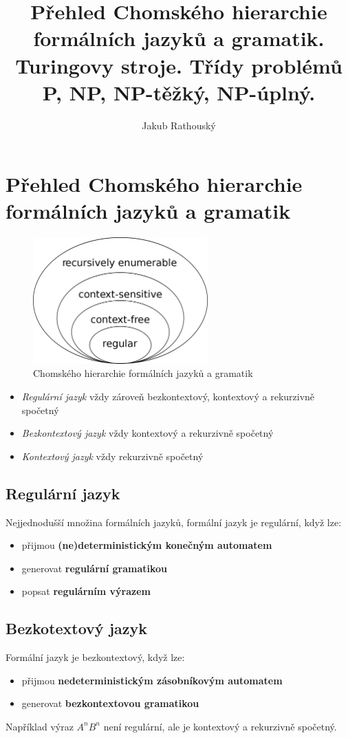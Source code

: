 \documentclass{szzclass}
\title{Přehled Chomského hierarchie formálních jazyků a gramatik. Turingovy stroje. Třídy problémů P, NP, NP-těžký, NP-úplný.}
\author{Jakub Rathouský}
\begin{document}
\maketitle
\tableofcontents
\newpage

\section{Přehled Chomského hierarchie formálních ja\-zyků a gramatik}

\begin{figure}[ht]
    \centering
    \includegraphics[width=0.6\textwidth]{topics/bi-spol-01/images/Chomsky_hierarchy.png}
    \caption{Chomského hierarchie formálních jazyků a gramatik}
\end{figure}

\begin{itemize}
\item\textit{Regulární jazyk}
vždy zároveň bezkontextový, kontextový a rekurzivně spočetný
\item\textit{Bezkontextový jazyk}
vždy kontextový a rekurzivně spočetný
\item\textit{Kontextový jazyk}
vždy rekurzivně spočetný
\end{itemize}

\subsection{Regulární jazyk}
Nejjednodušší množina formálních jazyků, formální jazyk je regulární, když lze:
\begin{itemize}
\item přijmou \textbf{(ne)deterministickým konečným automatem}
\item generovat \textbf{regulární gramatikou}
\item popsat \textbf{regulárním výrazem}
\end{itemize}

\subsection{Bezkotextový jazyk}
Formální jazyk je bezkontextový, když lze:
\begin{itemize}
\item přijmou \textbf{nedeterministickým zásobníkovým automatem}
\item generovat \textbf{bezkontextovou gramatikou}
\end{itemize}
Například výraz $A^nB^n$ není regulární, ale je kontextový a rekurzivně spočetný.
\end{document}
